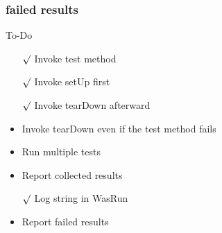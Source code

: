 \documentclass[lualatex]{beamer}
\begin{document}
\begin{frame}
    \frametitle{failed results}

    \begin{block}{To-Do}
        \begin{itemize}
            \item[$\surd$] Invoke test method
            \item[$\surd$] Invoke setUp first 
            \item[$\surd$] Invoke tearDown afterward 
            \item Invoke tearDown even if the test method fails 
            \item Run multiple tests 
            \item Report collected results 
            \item[$\surd$] Log string in WasRun 
            \item Report failed results
        \end{itemize}
    \end{block}
\end{frame}
\end{document}
